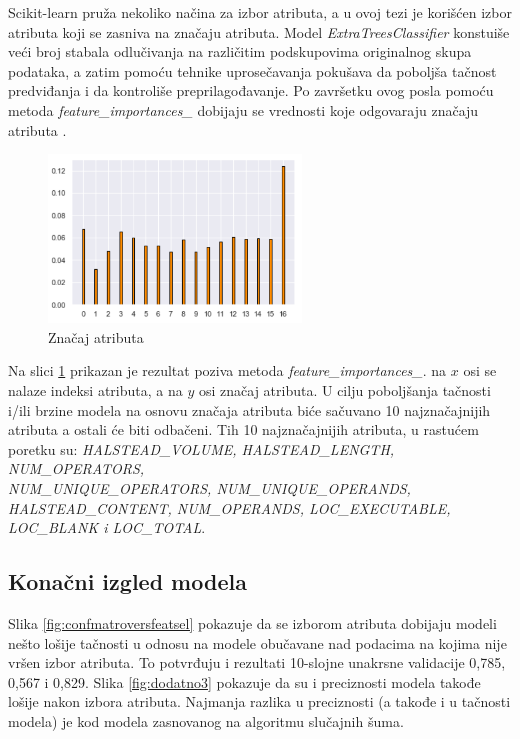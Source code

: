 \documentclass[12pt,oneside]{memoir}
\begin{document}
Scikit-learn pruža nekoliko načina za izbor atributa, a u ovoj tezi je korišćen izbor atributa koji se zasniva na značaju atributa. Model \textit{ExtraTreesClassifier} konstuiše veći broj stabala odlučivanja na različitim podskupovima originalnog skupa podataka, a zatim pomoću tehnike uprosečavanja pokušava da poboljša tačnost predviđanja i da kontroliše preprilagođavanje. Po završetku ovog posla pomoću metoda \textit{feature\_importances\_} dobijaju se vrednosti koje odgovaraju značaju atributa \cite{scikit-learn}. 

\begin{figure}[!ht]
  \centering
  \includegraphics[width=0.60\textwidth]{izbor_atributa}
  \caption{Značaj atributa}
  \label{fig:znacaj}
\end{figure}

Na slici \ref{fig:znacaj} prikazan je rezultat poziva metoda \textit{feature\_importances\_}. na $x$ osi se nalaze indeksi atributa, a na $y$ osi značaj atributa. U cilju poboljšanja tačnosti i/ili brzine modela na osnovu značaja atributa biće sačuvano 10 najznačajnijih atributa a ostali će biti odbačeni. Tih 10 najznačajnijih atributa, u rastućem poretku su: \textit{HALSTEAD\_VOLUME, 
HALSTEAD\_LENGTH, 
NUM\_OPERATORS, \\
NUM\_UNIQUE\_OPERATORS, 
NUM\_UNIQUE\_OPERANDS, \\HALSTEAD\_CONTENT, 
NUM\_OPERANDS, LOC\_EXECUTABLE, \\
LOC\_BLANK i LOC\_TOTAL}.

\subsection{Konačni izgled modela}

Slika \ref{fig:confmatroversfeatsel} pokazuje da se izborom atributa dobijaju modeli nešto lošije tačnosti u odnosu na modele obučavane nad podacima na kojima nije vršen izbor atributa. To potvrđuju i rezultati 10-slojne unakrsne validacije 0,785, 0,567 i 0,829. Slika \ref{fig:dodatno3} pokazuje da su i preciznosti modela takođe lošije nakon izbora atributa. Najmanja razlika u preciznosti (a takođe i u tačnosti modela) je kod modela zasnovanog na algoritmu slučajnih šuma. 
\end{document}

